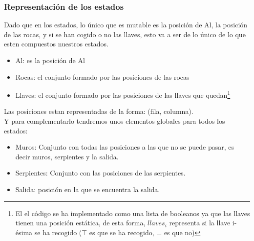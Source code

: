 \documentclass[11pt,spanish]{article}
\begin{document}
			\subsubsection{Representación de los estados}
				Dado que en los estados, lo único que es mutable es la posición de Al, la posición de las rocas, y si se han cogido o no las llaves, esto va a ser de lo único de lo que esten compuestos nuestros estados.
				\begin{itemize}
					\item Al: es la posición de Al
					\item Rocas: el conjunto formado por las posiciones de las rocas
					\item Llaves: el conjunto formado por las posiciones de las llaves que quedan\footnote{El el código se ha implementado como una lista de booleanos ya que las llaves tienen una posición estática, de esta forma, $llaves_i$ representa si la llave i-ésima se ha recogido ($\top$ es que se ha recogido, $\bot$ es que no)}
				\end{itemize}
				Las posiciones estan representadas de la forma: (fila, columna).\\
				Y para complementarlo tendremos unos elementos globales para todos los estados:
				\begin{itemize}
					\item Muros: Conjunto con todas las posiciones a las que no se puede pasar, es decir muros, serpientes y la salida.
					\item Serpientes: Conjunto con las posiciones de las serpientes.
					\item Salida: posición en la que se encuentra la salida.
				\end{itemize}
\end{document}
